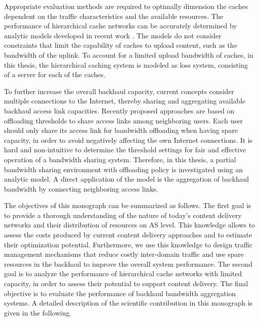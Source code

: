 Appropriate evaluation methods are required to optimally dimension the caches dependent on the traffic characteristics and the available resources.
The performance of hierarchical cache networks can be accurately determined by analytic models developed in recent work \cite{che2002hierarchical, martina2014unified}.
The models do not consider constraints that limit the capability of caches to upload content, such as the bandwidth of the uplink.
To account for a limited upload bandwidth of caches, in this thesis, the hierarchical caching system is modeled as loss system, consisting of a server for each of the caches.

To further increase the overall backhaul capacity, current concepts consider multiple connections to the Internet, thereby sharing and aggregating available backhaul access link capacities.
Recently proposed approaches are based on offloading thresholds to share access links among neighboring users.
Each user should only share its access link for bandwidth offloading when having spare capacity, in order to avoid negatively affecting the own Internet connections.
It is hard and non-intuitive to determine the threshold settings for fair and effective operation of a bandwidth sharing system.
Therefore, in this thesis, a partial bandwidth sharing environment with offloading policy is investigated using an analytic model.
A direct application of the model is the aggregation of backhaul bandwidth by connecting neighboring access links.

The objectives of this monograph can be summarized as follows.
The first goal is to provide a thorough understanding of the nature of today's content delivery networks and their distribution of resources on AS level.
This knowledge allows to assess the costs produced by current content delivery approaches and to estimate their optimization potential.
Furthermore, we use this knowledge to design traffic management mechanisms that reduce costly inter-domain traffic and use spare resources in the backhaul to improve the overall system performance.
The second goal is to analyze the performance of hierarchical cache networks with limited capacity, in order to assess their potential to support content delivery.
The final objective is to evaluate the performance of backhaul bandwidth aggregation systems.
A detailed description of the scientific contribution in this monograph is given in the following.



